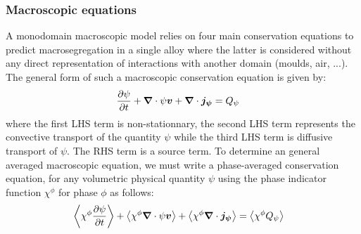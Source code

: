 \subsubsection{Macroscopic equations}
A monodomain macroscopic model relies on four main conservation equations to predict 
macrosegregation in a single alloy where the latter is considered without any direct representation of interactions with another
domain (moulds, air, ...). 
The general form of such a macroscopic conservation equation is given by:
\begin{align}
\label{eq:conservation_equation_noavg}
& \frac{\partial \psi}{\partial t}  + \boldsymbol{\nabla} \cdot \psi \boldsymbol{v} + \boldsymbol{\nabla} \cdot \boldsymbol{j_{\psi}}
= Q_{\psi}
\end{align}
where the first LHS term is non-stationnary, the second LHS term represents the convective transport
of the quantity $\psi$ while the third LHS term is diffusive transport of $\psi$. The RHS
term is a source term.
To determine an general averaged macroscopic equation, we must write
a phase-averaged conservation equation, for any volumetric physical quantity $\psi$ using the phase indicator function
$\chi^\phi$ for phase $\phi$ as follows: 
\begin{align}
\label{eq:conservation_equation_avg}
& \left \langle \chi^\phi \frac{\partial \psi}{\partial t}  \right \rangle + \left \langle \chi^\phi \boldsymbol{\nabla} \cdot \psi \boldsymbol{v} \right \rangle + \left \langle \chi^\phi \boldsymbol{\nabla} \cdot \boldsymbol{j_{\psi}} \right \rangle = \left \langle \chi^\phi Q_{\psi} \right \rangle
\end{align}
